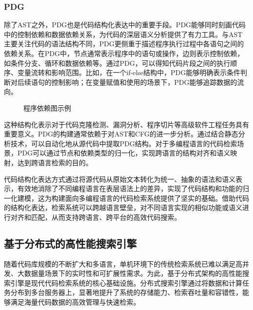 \documentclass[UTF8,a4paper,12pt]{ctexart}
\numberwithin{equation}{section}
\begin{document}
\subsubsection{PDG}
除了AST之外，PDG也是代码结构化表达中的重要手段。PDG能够同时刻画代码中的控制依赖和数据依赖关系，为代码的深层语义分析提供了有力工具。与AST主要关注代码的语法结构不同，PDG更侧重于描述程序执行过程中各语句之间的依赖关系。在PDG中，节点通常表示程序中的语句或操作，边则表示控制依赖，如条件分支、循环和数据依赖等。通过PDG，可以得知代码片段之间的执行顺序、变量流转和影响范围。比如，在一个if-else结构中，PDG能够明确表示条件判断对后续语句的控制影响；在变量赋值和使用的场景下，PDG能够追踪数据的流向。
\begin{figure}[H]
	\caption{程序依赖图示例}
	\label{pdg}
\end{figure}
这种结构化表示对于代码克隆检测、漏洞分析、程序切片等高级软件工程任务具有重要意义。PDG的构建通常依赖于对AST和CFG的进一步分析。通过结合静态分析技术，可以自动化地从源代码中提取PDG结构。对于多编程语言的代码检索场景，PDG可以通过节点和依赖类型的归一化，实现跨语言的结构对齐和语义映射，达到跨语言检索的目的。\par
代码结构化表达方式通过将源代码从原始文本转化为统一、抽象的语法和语义表示，有效地消除了不同编程语言在表层语法上的差异，实现了代码结构和功能的归一化建模，这为构建面向多编程语言的代码检索系统提供了坚实的基础。借助代码的结构化表达，检索系统可以跨越语言壁垒，对不同语言实现的相似功能或语义进行对齐和匹配，从而支持跨语言、跨平台的高效代码搜索。

\subsection{基于分布式的高性能搜索引擎}
随着代码库规模的不断扩大和多语言，单机环境下的传统检索系统已难以满足高并发、大数据量场景下的实时性和可扩展性需求。为此，基于分布式架构的高性能搜索引擎是现代代码检索系统的核心基础设施。分布式搜索引擎通过将数据和计算任务分布到多台服务器上，显著地提升了系统的存储能力、检索吞吐量和容错性，能够满足海量代码数据的高效管理与快速检索。
\end{document}
